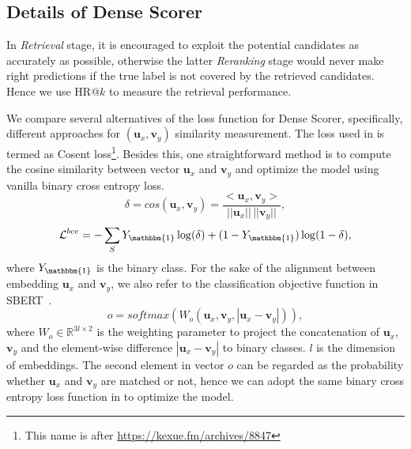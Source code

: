 \subsection{Details of Dense Scorer}
\label{sec:appendix-dense}
In \textit{Retrieval} stage, it is encouraged to exploit the potential candidates as accurately as possible, otherwise the latter \textit{Reranking} stage would never make right predictions if the true label is not covered by the retrieved candidates. Hence we use HR@$k$ to measure the retrieval performance.

We compare several alternatives of the loss function for Dense Scorer, specifically, different approaches for $(\mathbf{u}_x, \mathbf{v}_y)$ similarity measurement. The loss used in  is termed as Cosent loss\footnote{This name is after \href{https://kexue.fm/archives/8847}{https://kexue.fm/archives/8847}}. Besides this, one straightforward method is to compute the cosine similarity between vector $\mathbf{u}_x$ and $\mathbf{v}_y$ and optimize the model using vanilla binary cross entropy loss.
\begin{equation}
    \delta=\textit{cos}(\mathbf{u}_x,\mathbf{v}_y)=\frac{<\mathbf{u}_x, \mathbf{v}_y>}{||\mathbf{u}_x||\,||\mathbf{v}_y||},
\end{equation}
\begin{equation}
\label{eq:bce}
    \mathcal{L}^{bce}=-\sum_{S} Y_{\mathbbm{1}} \log(\delta) + (1-Y_{\mathbbm{1}})\log(1-\delta),
\end{equation}
where $Y_{\mathbbm{1}}$ is the binary class.
For the sake of the alignment between embedding $\mathbf{u}_x$ and $\mathbf{v}_y$, we also refer to the classification objective function in SBERT~\cite{reimers2019sentence}.
\begin{equation}
    o=softmax(W_o(\mathbf{u}_x, \mathbf{v}_y, |\mathbf{u}_x-\mathbf{v}_y|)),
\end{equation}
where $W_o\in \mathbb{R}^{3l\times 2}$ is the weighting parameter to project the concatenation of $\mathbf{u}_x$, $\mathbf{v}_y$ and the element-wise difference $|\mathbf{u}_x-\mathbf{v}_y|$ to binary classes. $l$ is the dimension of embeddings. The second element in vector $o$ can be regarded as the probability whether $\mathbf{u}_x$ and $\mathbf{v}_y$ are matched or not, hence we can adopt the same binary cross entropy loss function in  to optimize the model.

